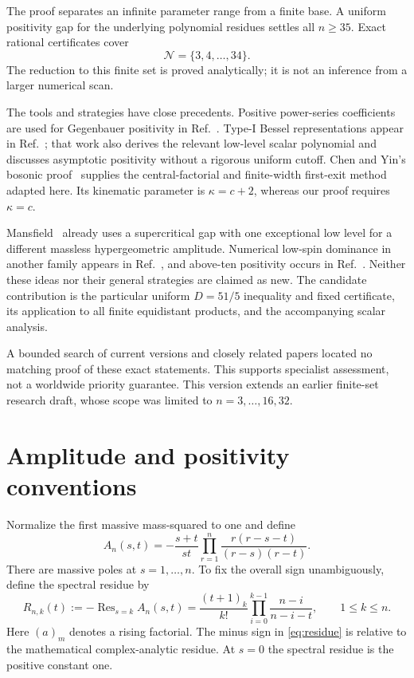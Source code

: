 \documentclass[11pt,a4paper]{article}
\theoremstyle{remark}\newtheorem{remark}[theorem]{Remark}
\newcommand{\Res}{\operatorname{Res}}
\newcommand{\cset}{\mathcal N}
\begin{document}
The proof separates an infinite parameter range from a finite base. A uniform positivity gap for the underlying polynomial residues settles all $n\geq35$. Exact rational certificates cover
\begin{equation}\label{eq:set}
\cset=\{3,4,\ldots,34\}.
\end{equation}
The reduction to this finite set is proved analytically; it is not an inference from a larger numerical scan.

The tools and strategies have close precedents. Positive power-series coefficients are used for Gegenbauer positivity in Ref.~\cite[Section 4.6.1]{Geiser}. Type-I Bessel representations appear in Ref.~\cite[Appendix B]{AHHM}; that work also derives the relevant low-level scalar polynomial and discusses asymptotic positivity without a rigorous uniform cutoff. Chen and Yin's bosonic proof~\cite{Chen} supplies the central-factorial and finite-width first-exit method adapted here. Its kinematic parameter is $\kappa=c+2$, whereas our proof requires $\kappa=c$.

Mansfield~\cite[Section 3.2]{Mansfield} already uses a supercritical gap with one exceptional low level for a different massless hypergeometric amplitude. Numerical low-spin dominance in another family appears in Ref.~\cite[Section 4.1.2]{Wang}, and above-ten positivity occurs in Ref.~\cite{Cheung}. Neither these ideas nor their general strategies are claimed as new. The candidate contribution is the particular uniform $D=51/5$ inequality and fixed certificate, its application to all finite equidistant products, and the accompanying scalar analysis.

A bounded search of current versions and closely related papers located no matching proof of these exact statements. This supports specialist assessment, not a worldwide priority guarantee. This version extends an earlier finite-set research draft, whose scope was limited to $n=3,\ldots,16,32$.

\section{Amplitude and positivity conventions}
Normalize the first massive mass-squared to one and define
\begin{equation}\label{eq:amplitude}
 A_n(s,t)=-\frac{s+t}{st}\prod_{r=1}^{n}
 \frac{r(r-s-t)}{(r-s)(r-t)}.
\end{equation}
There are massive poles at $s=1,\ldots,n$. To fix the overall sign unambiguously, define the spectral residue by
\begin{equation}\label{eq:residue}
 R_{n,k}(t):=-\Res_{s=k}A_n(s,t)
 =\frac{(t+1)_k}{k!}\prod_{i=0}^{k-1}\frac{n-i}{n-i-t},
 \qquad 1\leq k\leq n.
\end{equation}
Here $(a)_m$ denotes a rising factorial. The minus sign in \eqref{eq:residue} is relative to the mathematical complex-analytic residue. At $s=0$ the spectral residue is the positive constant one.
\end{document}
